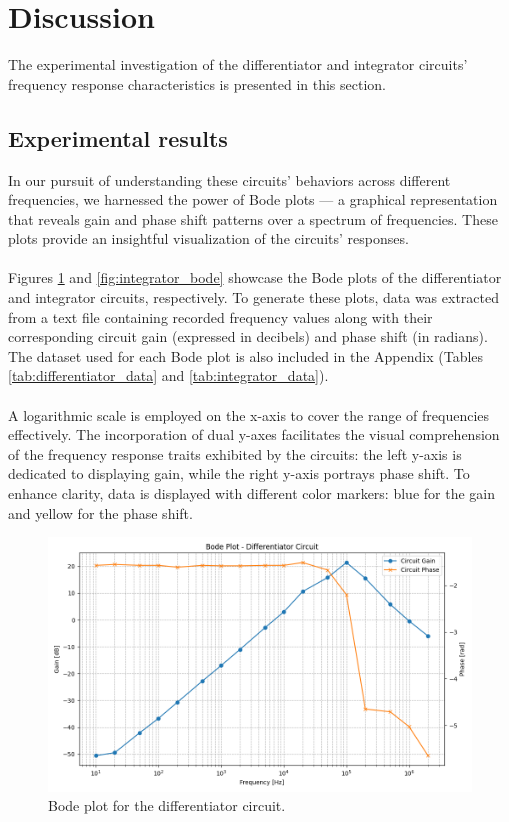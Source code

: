 \section{Discussion}
The experimental investigation of the differentiator and integrator circuits' frequency response characteristics is presented in this section.

	\subsection{Experimental results}
		In our pursuit of understanding these circuits' behaviors across different frequencies, we harnessed the power of Bode plots — a graphical representation that reveals gain and phase shift patterns over a spectrum of frequencies. 
		These plots provide an insightful visualization of the circuits' responses. \\\\
		Figures \ref{fig:differentiator_bode} and \ref{fig:integrator_bode} showcase the Bode plots of the differentiator and integrator circuits, respectively.
		To generate these plots, data was extracted from a text file containing recorded frequency values along with their corresponding circuit gain (expressed in decibels) and phase shift (in radians). 
		The dataset used for each Bode plot is also included in the Appendix (Tables \ref{tab:differentiator_data} and \ref{tab:integrator_data}). \\\\
		A logarithmic scale is employed on the x-axis to cover the range of frequencies effectively. 
		The incorporation of dual y-axes facilitates the visual comprehension of the frequency response traits exhibited by the circuits: 
		the left y-axis is dedicated to displaying gain, while the right y-axis portrays phase shift.
		To enhance clarity, data is displayed with different color markers: blue for the gain and yellow for the phase shift.

		\begin{figure}[H]
		    \centering
		    \includegraphics[width=1\textwidth]{figures/differentiator/bode_plot.png}
		    \caption{Bode plot for the differentiator circuit.}
		    \label{fig:differentiator_bode} 
		\end{figure}


